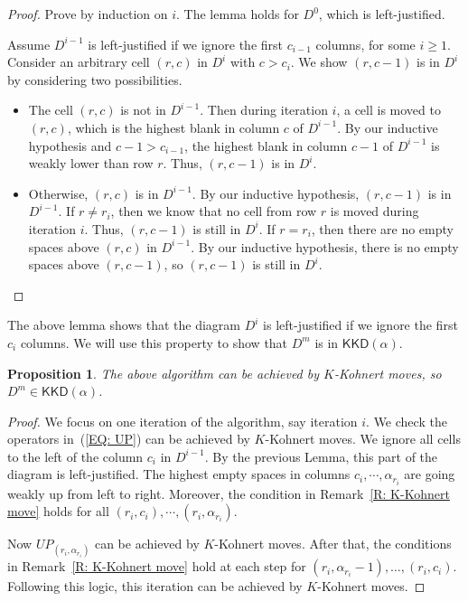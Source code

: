 \documentclass[10pt]{amsart}
\theoremstyle{plain}
\theoremstyle{plain}
\theoremstyle{definition}
\theoremstyle{definition}
\theoremstyle{definition}
\theoremstyle{plain}
\theoremstyle{plain}
\theoremstyle{plain}
\theoremstyle{plain}
\newtheorem{prop}[prop]{Proposition}
\theoremstyle{plain}
\theoremstyle{remark}
\theoremstyle{remark}
\theoremstyle{plain}
\theoremstyle{plain}
\newcommand{\KKD}{\mathsf{KKD}}
\begin{document}
\begin{proof}
Prove by induction on $i$.
The lemma holds for $D^0$, which is left-justified.

Assume $D^{i-1}$ is left-justified if we ignore the first $c_{i-1}$ columns,
for some $i \geq 1$.
Consider an arbitrary cell $(r,c)$ in $D^i$
with $c > c_i$.
We show $(r, c-1)$ is in $D^i$ by considering two possibilities.
\begin{itemize}
\item[-] The cell $(r,c)$ is not in $D^{i-1}$.
Then during iteration $i$, a cell is moved to $(r,c)$,
which is the highest blank in column $c$ of $D^{i-1}$.
By our inductive hypothesis and $c-1 > c_{i-1}$, 
the highest blank in column $c-1$ of $D^{i-1}$
is weakly lower than row $r$.
Thus, $(r,c-1)$ is in $D^i$.
\item[-] Otherwise, $(r,c)$ is in $D^{i-1}$.
By our inductive hypothesis, 
$(r, c-1)$ is in $D^{i-1}$.
If $r \neq r_i$,
then we know that no cell from row $r$ is moved 
during iteration $i$.
Thus, $(r,c-1)$ is still in $D^i$.
If $r = r_i$,
then there are no empty spaces above $(r,c)$
in $D^{i-1}$.
By our inductive hypothesis, 
there is no empty spaces above $(r,c-1)$,
so $(r,c-1)$ is still in $D^i$. \qedhere
\end{itemize}
\end{proof}

The above lemma shows that the diagram $D^i$ is left-justified if we ignore the first $c_i$ columns.
We will use this property to show that $D^m$ 
is in $\KKD(\alpha)$.
\begin{prop}\label{P: Top Las 1}
The above algorithm can be achieved by $K$-Kohnert moves,
so $D^m \in \KKD(\alpha)$.
\end{prop}

\begin{proof}
We focus on one iteration of the algorithm,
say iteration $i$.
We check the operators 
in~(\ref{EQ: UP}) can be achieved by $K$-Kohnert moves. 
We ignore all cells to the left of the column $c_i$ in $D^{i-1}$.
By the previous Lemma, this part of the diagram 
is left-justified.
The highest empty spaces in columns $c_i, \cdots, \alpha_{r_i}$
are going weakly up from left to right.
Moreover, the condition in Remark~\ref{R: K-Kohnert move} 
holds for all $(r_i, c_i), \cdots, (r_i, \alpha_{r_i})$.

Now $UP_{(r_i, \alpha_{r_i})}$
can be achieved by $K$-Kohnert moves.
After that, the conditions in Remark~\ref{R: K-Kohnert move} 
hold at each step for $(r_i, \alpha_{r_i} - 1), \dots, (r_i, c_i)$.
Following this logic, this iteration can be achieved by $K$-Kohnert moves. 
\end{proof}
\end{document}
